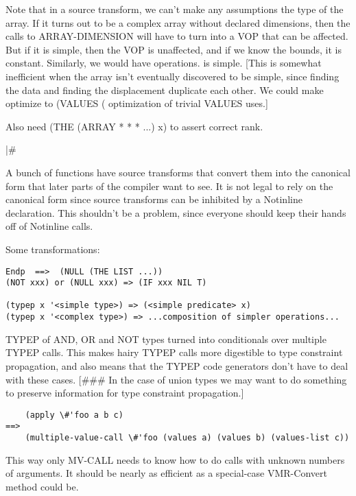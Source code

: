 Note that in a source transform, we can't make any assumptions the type of the
array.  If it turns out to be a complex array without declared dimensions, then
the calls to ARRAY-DIMENSION will have to turn into a VOP that can be affected.
But if it is simple, then the VOP is unaffected, and if we know the bounds, it
is constant.  Similarly, we would have %
operations.  %
is simple.  [This is somewhat inefficient when the array isn't eventually
discovered to be simple, since finding the data and finding the displacement
duplicate each other.  We could make %
optimize to (VALUES (%
optimization of trivial VALUES uses.]

Also need (THE (ARRAY * * * ...) x) to assert correct rank.

|\#

A bunch of functions have source transforms that convert them into the
canonical form that later parts of the compiler want to see.  It is not legal
to rely on the canonical form since source transforms can be inhibited by a
Notinline declaration.  This shouldn't be a problem, since everyone should keep
their hands off of Notinline calls.

Some transformations:
\begin{verbatim}
Endp  ==>  (NULL (THE LIST ...))
(NOT xxx) or (NULL xxx) => (IF xxx NIL T)

(typep x '<simple type>) => (<simple predicate> x)
(typep x '<complex type>) => ...composition of simpler operations...
\end{verbatim}
TYPEP of AND, OR and NOT types turned into conditionals over multiple TYPEP
calls.  This makes hairy TYPEP calls more digestible to type constraint
propagation, and also means that the TYPEP code generators don't have to deal
with these cases.  [\#\#\# In the case of union types we may want to do something
to preserve information for type constraint propagation.]


\begin{verbatim}
    (apply \#'foo a b c)
==>
    (multiple-value-call \#'foo (values a) (values b) (values-list c))
\end{verbatim}

This way only MV-CALL needs to know how to do calls with unknown numbers of
arguments.  It should be nearly as efficient as a special-case VMR-Convert
method could be.


